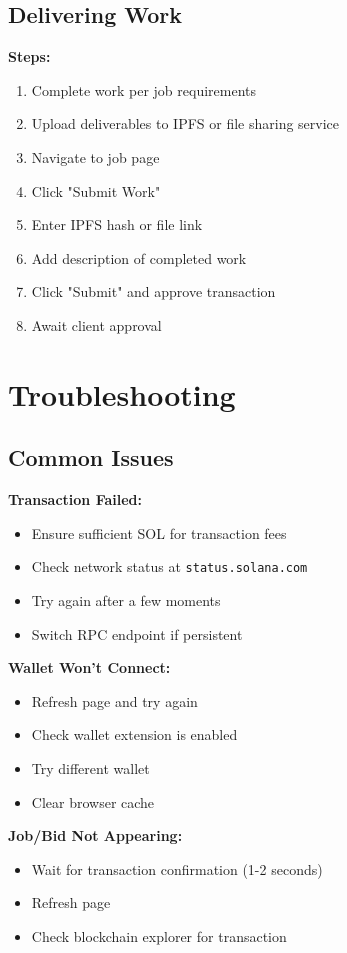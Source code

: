 \documentclass[a4paper,13pt,twoside]{report}
\theoremstyle{definition}
\begin{document}
\subsection{Delivering Work}

\textbf{Steps:}
\begin{enumerate}
    \item Complete work per job requirements
    \item Upload deliverables to IPFS or file sharing service
    \item Navigate to job page
    \item Click "Submit Work"
    \item Enter IPFS hash or file link
    \item Add description of completed work
    \item Click "Submit" and approve transaction
    \item Await client approval
\end{enumerate}

\section{Troubleshooting}

\subsection{Common Issues}

\textbf{Transaction Failed:}
\begin{itemize}
    \item Ensure sufficient SOL for transaction fees
    \item Check network status at \texttt{status.solana.com}
    \item Try again after a few moments
    \item Switch RPC endpoint if persistent
\end{itemize}

\textbf{Wallet Won't Connect:}
\begin{itemize}
    \item Refresh page and try again
    \item Check wallet extension is enabled
    \item Try different wallet
    \item Clear browser cache
\end{itemize}

\textbf{Job/Bid Not Appearing:}
\begin{itemize}
    \item Wait for transaction confirmation (1-2 seconds)
    \item Refresh page
    \item Check blockchain explorer for transaction
\end{itemize}
\end{document}
